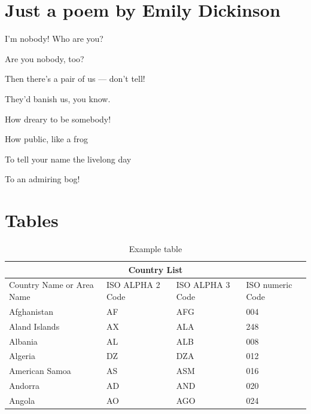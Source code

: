 \documentclass{imc-inf}
\begin{document}
\section {Just a poem by Emily Dickinson}

I'm nobody! Who are you?

Are you nobody, too?

Then there's a pair of us — don't tell!

They'd banish us, you know.

How dreary to be somebody!

How public, like a frog

To tell your name the livelong day

To an admiring bog!

\section{Tables}

\begin{table}[ht]
\begin{tabular}{ |p{3cm}||p{3cm}|p{3cm}|p{3cm}|  }
	\hline
	\multicolumn{4}{|c|}{Country List} \\
	\hline
	Country Name     or Area Name& ISO ALPHA 2 Code &ISO ALPHA 3 Code&ISO numeric Code\\
	\hline
	Afghanistan   & AF    &AFG&   004\\
	Aland Islands&   AX  & ALA   &248\\
	Albania &AL & ALB&  008\\
	Algeria    &DZ & DZA&  012\\
	American Samoa&   AS  & ASM&016\\
	Andorra& AD  & AND   &020\\
	Angola& AO  & AGO&024\\
	\hline
\end{tabular}
\caption{\label{tab:table-name}Example table}
\end{table}



%
%
%
%
%

\backmatter%
	
 \typeout{}
	
	
\end{document}
